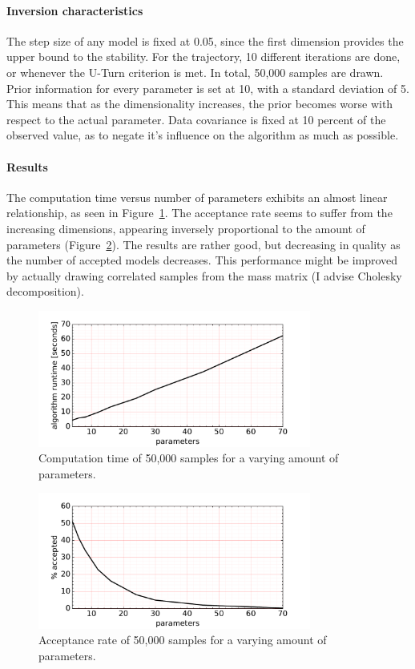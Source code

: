 \paragraph{Inversion characteristics}The step size of any model is fixed at 0.05, since the first dimension provides the upper bound to the stability. For the trajectory, 10 different iterations are done, or whenever the U-Turn criterion is met. In total, 50,000 samples are drawn. Prior information for every parameter is set at 10, with a standard deviation of 5. This means that as the dimensionality increases, the prior becomes worse with respect to the actual parameter. Data covariance is fixed at 10 percent of the observed value, as to negate it's influence on the algorithm as much as possible. 

\paragraph{Results}The computation time versus number of parameters exhibits an almost linear relationship, as seen in Figure~\ref{fig:linear_system.high_dim.time}. The acceptance rate seems to suffer from the increasing dimensions, appearing inversely proportional to the amount of parameters (Figure~\ref{fig:linear_system.high_dim.acceptance}). The results are rather good, but decreasing in quality as the number of accepted models decreases. This performance might be improved by actually drawing correlated samples from the mass matrix (I advise Cholesky decomposition).

\begin{figure}
	\centering
	\includegraphics[width=0.8\textwidth]{figures/linear_systems/higher_dim/performance}
	\caption{Computation time of 50,000 samples for a varying amount of parameters.}
	\label{fig:linear_system.high_dim.time}
\end{figure}

\begin{figure}
	\centering
	\includegraphics[width=0.8\textwidth]{figures/linear_systems/higher_dim/acceptance_rate}
	\caption{Acceptance rate of 50,000 samples for a varying amount of parameters.}
	\label{fig:linear_system.high_dim.acceptance}
\end{figure}









